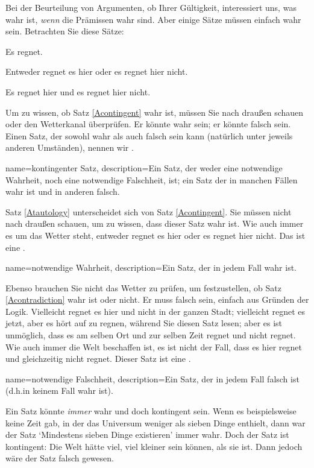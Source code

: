 Bei der Beurteilung von Argumenten, ob Ihrer Gültigkeit, interessiert uns, was wahr ist, \emph{wenn} die Prämissen wahr sind. Aber einige Sätze müssen einfach wahr sein. Betrachten Sie diese Sätze:
	\begin{earg}
		\item[\ex{Acontingent}] Es regnet.
		\item[\ex{Atautology}] Entweder regnet es hier oder es regnet hier nicht.
		\item[\ex{Acontradiction}] Es regnet hier und es regnet hier nicht.
	\end{earg}
Um zu wissen, ob Satz \ref{Acontingent} wahr ist, müssen Sie nach drau{\ss}en schauen oder den Wetterkanal überprüfen. Er könnte wahr sein; er könnte falsch sein. Einen Satz, der sowohl wahr als auch falsch sein kann (natürlich unter jeweils anderen Umständen), nennen wir .

{
name=kontingenter Satz,
description={Ein Satz, der weder eine \gls{notwendige Wahrheit}, noch eine \gls{notwendige Falschheit}, ist; ein Satz der in manchen Fällen wahr ist und in anderen falsch.}
}

Satz \ref{Atautology} unterscheidet sich von Satz \ref{Acontingent}. Sie müssen nicht nach drau{\ss}en schauen, um zu wissen, dass dieser Satz wahr ist. Wie auch immer es um das Wetter steht, entweder regnet es hier oder es regnet hier nicht. Das ist eine . 

{
name={notwendige Wahrheit},
description={Ein Satz, der in jedem Fall wahr ist.}
}

Ebenso brauchen Sie nicht das Wetter zu prüfen, um festzustellen, ob Satz \ref{Acontradiction} wahr ist oder nicht. Er muss falsch sein, einfach aus Gründen der Logik. Vielleicht regnet es hier und nicht in der ganzen Stadt; vielleicht regnet es jetzt, aber es hört auf zu regnen, während Sie diesen Satz lesen; aber es ist unmöglich, dass es am selben Ort und zur selben Zeit regnet und nicht regnet. Wie auch immer die Welt beschaffen ist, es ist nicht der Fall, dass es hier regnet und gleichzeitig nicht regnet. Dieser Satz ist eine .

{
name={notwendige Falschheit},
description={Ein Satz, der in jedem Fall falsch ist (d.h.\@ in keinem Fall wahr ist).}
}

Ein Satz könnte \emph{immer} wahr und doch kontingent sein. Wenn es beispielsweise keine Zeit gab, in der das Universum weniger als sieben Dinge enthielt, dann war der Satz `Mindestens sieben Dinge existieren' immer wahr. Doch der Satz ist kontingent: Die Welt hätte viel, viel kleiner sein können, als sie ist. Dann jedoch wäre der Satz falsch gewesen. 


